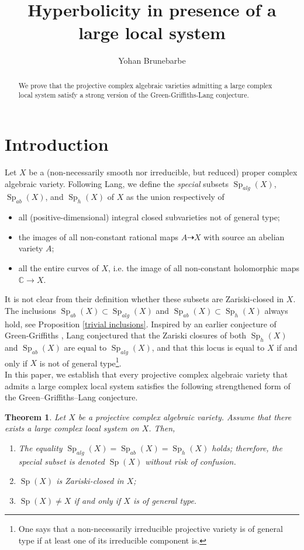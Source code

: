 \documentclass[11pt,letterpaper]{amsart}
\title{Hyperbolicity in presence of a large local system}
\author{Yohan Brunebarbe}
\def\bC{\mathbb{C}}
\theoremstyle{plain}
\newtheorem{thmintro}{Theorem}
\DeclareMathOperator{\Sp}{Sp}
\begin{document}
\begin{abstract}
We prove that the projective complex algebraic varieties admitting a large complex local system satisfy a strong version of the Green-Griffiths-Lang conjecture.
\end{abstract}

\maketitle
\section{Introduction}

Let $X$ be a (non-necessarily smooth nor irreducible, but reduced) proper complex algebraic variety. Following Lang, we define the \emph{special} subsets $\Sp_{alg}(X)$, $\Sp_{ab}(X)$, and $\Sp_h(X)$ of $X$ as the union respectively of
\begin{itemize}
\item all (positive-dimensional) integral closed subvarieties not of general type;
\item the images of all non-constant rational maps $A \dasharrow X$ with source an abelian variety $A$;
\item all the entire curves of $X$, i.e. the image of all non-constant holomorphic maps $\bC \to X$.
\end{itemize}
It is not clear from their definition whether these subsets are Zariski-closed in $X$. The inclusions $\Sp_{ab}(X) \subset \Sp_{alg}(X)$ and $\Sp_{ab}(X) \subset \Sp_h(X)$ always hold, see Proposition \ref{trivial inclusions}. Inspired by an earlier conjecture of Green-Griffiths \cite{Green-Griffiths79}, Lang \cite{Lang86} conjectured that the Zariski closures of both $\Sp_{h}(X)$ and $\Sp_{ab}(X)$ are equal to $\Sp_{alg}(X)$, and that this locus is equal to $X$ if and only if $X$ is not of general type\footnote{One says that a non-necessarily irreducible projective variety is of general type if at least one of its irreducible component is.}. \\

In this paper, we establish that every projective complex algebraic variety that admits a large complex local system  satisfies the following strengthened form of the Green–Griffiths–Lang conjecture.

\begin{thmintro}\label{Lang for large}
Let $X$ be a projective complex algebraic variety. Assume that there exists a large complex local system on $X$. Then, 
\begin{enumerate}
\item The equality $\Sp_{alg}(X) = \Sp_{ab}(X) = \Sp_h(X)$ holds; therefore, the special subset is denoted $\Sp(X)$ without risk of confusion.
\item $ \Sp(X)$ is Zariski-closed in $X$;
\item $ \Sp(X) \neq X$ if and only if $X$ is of general type.
\end{enumerate} 
\end{thmintro}
\end{document}
